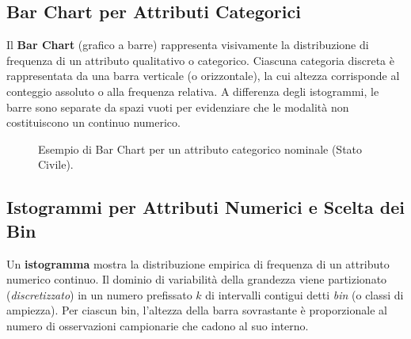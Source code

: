 \subsection{Bar Chart per Attributi Categorici}
Il \textbf{Bar Chart} (grafico a barre) rappresenta visivamente la distribuzione di frequenza di un attributo qualitativo o categorico. Ciascuna categoria discreta \`e rappresentata da una barra verticale (o orizzontale), la cui altezza corrisponde al conteggio assoluto o alla frequenza relativa. A differenza degli istogrammi, le barre sono separate da spazi vuoti per evidenziare che le modalit\`a non costituiscono un continuo numerico.

\begin{figure}[H]
\centering
{}
\caption{Esempio di Bar Chart per un attributo categorico nominale (Stato Civile).}
\label{fig:barchart-example}
\end{figure}

\subsection{Istogrammi per Attributi Numerici e Scelta dei Bin}
Un \textbf{istogramma} mostra la distribuzione empirica di frequenza di un attributo numerico continuo. Il dominio di variabilit\`a della grandezza viene partizionato (\textit{discretizzato}) in un numero prefissato $k$ di intervalli contigui detti \textit{bin} (o classi di ampiezza). Per ciascun bin, l'altezza della barra sovrastante \`e proporzionale al numero di osservazioni campionarie che cadono al suo interno.

